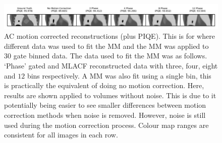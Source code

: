             \begin{figure}
                \centering
                
                \includegraphics[width=1.0\linewidth]{figures/motion_correction_2_results_2_noiseless_phase_visual_analysis.png}
                
                \captionsetup{singlelinecheck=false}
                \caption{
                    \gls{AC} motion corrected reconstructions (plus \gls{PIQE}). This is for where different data was used to fit the \gls{MM} and the \gls{MM} was applied to $30$ gate binned data. The data used to fit the \gls{MM} was as follows. `Phase' gated and \gls{MLACF} reconstructed data with three, four, eight and $12$ bins respectively. A \gls{MM} was also fit using a single bin, this is practically the equivalent of doing no motion correction. Here, results are shown applied to volumes without noise. This is due to it potentially being easier to see smaller differences between motion correction methods when noise is removed. However, noise is still used during the motion correction process. Colour map ranges are consistent for all images in each row.
                }
                
                \label{fig:evaluation_of_pet_ct_motion_correction_incorporating_motion_models_using_mlacf_and_complex_gating_schemes_results_noiseless_phase_visual_analysis}
            \end{figure}

